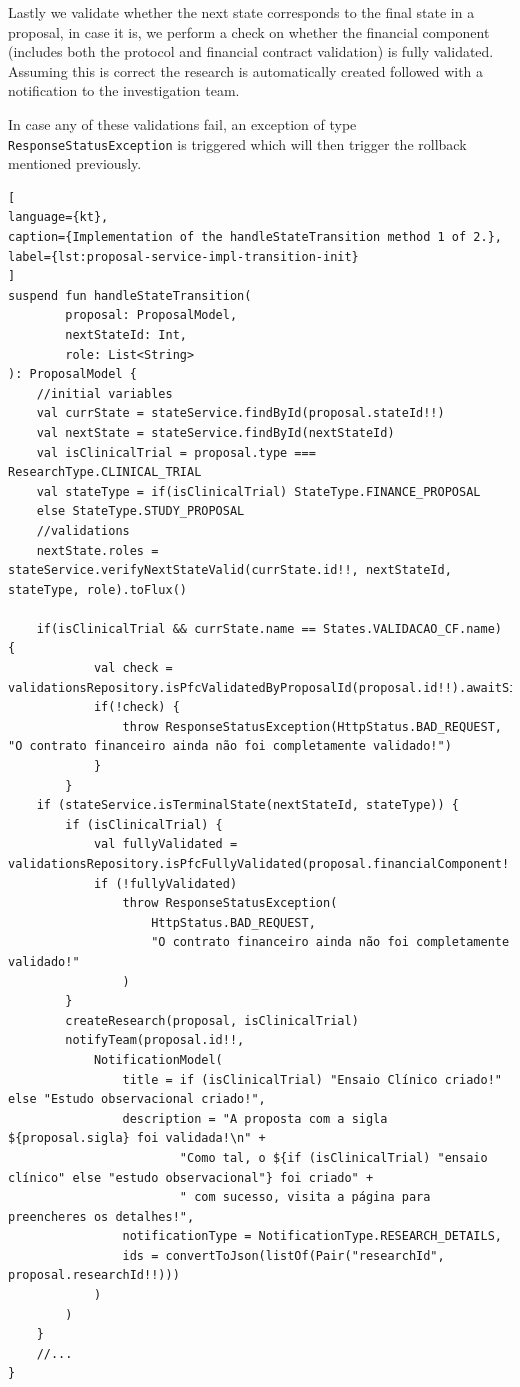 Lastly we validate whether the next state corresponds to the final state in a proposal, in case it is, we perform a check on whether the financial component (includes both the protocol and financial contract validation) is fully validated. Assuming this is correct the research is automatically created followed with a notification to the investigation team.

In case any of these validations fail, an exception of type \lstinline{ResponseStatusException} is triggered which will then trigger the rollback mentioned previously. 

\begin{lstlisting}[
language={kt},
caption={Implementation of the handleStateTransition method 1 of 2.},
label={lst:proposal-service-impl-transition-init}
]
suspend fun handleStateTransition(
        proposal: ProposalModel,
        nextStateId: Int,
        role: List<String>
): ProposalModel {
    //initial variables
    val currState = stateService.findById(proposal.stateId!!)
    val nextState = stateService.findById(nextStateId)
    val isClinicalTrial = proposal.type === ResearchType.CLINICAL_TRIAL
    val stateType = if(isClinicalTrial) StateType.FINANCE_PROPOSAL
    else StateType.STUDY_PROPOSAL
    //validations
    nextState.roles = stateService.verifyNextStateValid(currState.id!!, nextStateId, stateType, role).toFlux()
    
    if(isClinicalTrial && currState.name == States.VALIDACAO_CF.name) {
            val check = validationsRepository.isPfcValidatedByProposalId(proposal.id!!).awaitSingle()
            if(!check) {
                throw ResponseStatusException(HttpStatus.BAD_REQUEST, "O contrato financeiro ainda não foi completamente validado!")
            }
        }
    if (stateService.isTerminalState(nextStateId, stateType)) {
        if (isClinicalTrial) {
            val fullyValidated = validationsRepository.isPfcFullyValidated(proposal.financialComponent!!.id!!).awaitSingle()
            if (!fullyValidated)
                throw ResponseStatusException(
                    HttpStatus.BAD_REQUEST,
                    "O contrato financeiro ainda não foi completamente validado!"
                )
        }
        createResearch(proposal, isClinicalTrial)
        notifyTeam(proposal.id!!,
            NotificationModel(
                title = if (isClinicalTrial) "Ensaio Clínico criado!" else "Estudo observacional criado!",
                description = "A proposta com a sigla ${proposal.sigla} foi validada!\n" +
                        "Como tal, o ${if (isClinicalTrial) "ensaio clínico" else "estudo observacional"} foi criado" +
                        " com sucesso, visita a página para preencheres os detalhes!",
                notificationType = NotificationType.RESEARCH_DETAILS,
                ids = convertToJson(listOf(Pair("researchId", proposal.researchId!!)))
            )
        )
    }
    //...
}
\end{lstlisting}

